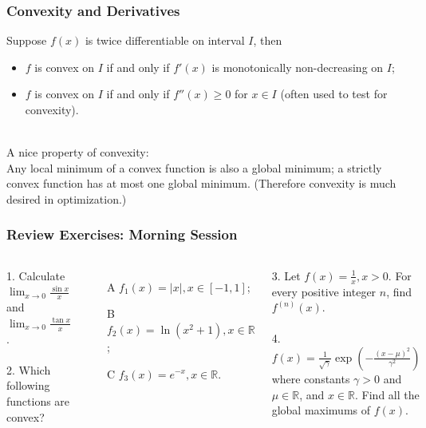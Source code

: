 \documentclass{beamer}
\begin{document}
\begin{frame}
\frametitle{Convexity and Derivatives}
Suppose $f(x)$ is twice differentiable on interval $I$, then
\begin{itemize}
\item $f$ is convex on $I$ if and only if $f'(x)$ is monotonically non-decreasing on $I$;
\item $f$ is convex on $I$ if and only if $f''(x) \geq 0$ for $x \in I$  (often used to test for convexity).
\end{itemize}
~\\
A nice property of convexity:\\
Any local minimum of a convex function is also a global minimum; a strictly convex function has at most one global minimum. (Therefore convexity is much desired in optimization.)

\end{frame}

\begin{frame}
\frametitle{Review Exercises: Morning Session}
\begin{columns}[t] %

1. Calculate $\lim_{x \rightarrow 0} \frac{\sin x}{x}$ and $\lim_{x \rightarrow 0} \frac{\tan x}{x}$.
\\~\\
2. Which following functions are convex?
\begin{itemize}
\item[A] $f_1(x) = \vert x \vert, x\in [-1,1]$;
\item[B] $f_2(x) = \ln(x^2+1), x \in \mathbb{R}$;
\item[C] $f_3(x) = e^{-x}, x\in \mathbb{R}$.
\end{itemize}

3. Let $f(x) = \frac{1}{x}, x>0$. For every positive integer $n$, find $f^{(n)}(x)$.
\\~\\
4. $f(x) = \frac{1}{\sqrt{\gamma}} \exp \left(-\frac{(x-\mu)^2}{\gamma^2}\right)$ where constants $\gamma > 0$ and $\mu \in \mathbb{R}$, and $x\in \mathbb{R}$. Find all the global maximums of $f(x)$.

\end{columns}
\end{frame}
\end{document}
